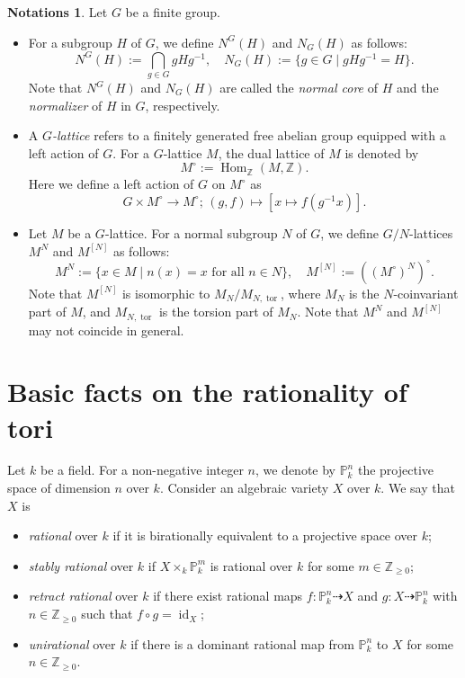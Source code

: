 \documentclass[12pt]{amsart}
\theoremstyle{plain}
\theoremstyle{definition}
\newtheorem*{nota}{Notations}
\numberwithin{thm}{section}
\numberwithin{equation}{section}
\newcommand{\Znn}{\mathbb{Z}_{\geq 0}}
\newcommand{\Z}{\mathbb{Z}}
\renewcommand{\P}{\mathbb{P}}
\DeclareMathOperator{\Hom}{Hom}
\DeclareMathOperator{\id}{id}
\DeclareMathOperator{\tor}{tor}
\begin{document}
\begin{nota}
Let $G$ be a finite group. 
\begin{itemize}
\item For a subgroup $H$ of $G$, we define $N^{G}(H)$ and $N_{G}(H)$ as follows: 
\begin{equation*}
N^{G}(H):=\bigcap_{g\in G}gHg^{-1},\quad
N_{G}(H):=\{g\in G\mid gHg^{-1}=H\}. 
\end{equation*}
Note that $N^{G}(H)$ and $N_{G}(H)$ are called the \emph{normal core} of $H$ and the \emph{normalizer} of $H$ in $G$, respectively. 
\item A \emph{$G$-lattice} refers to a finitely generated free abelian group equipped with a left action of $G$. For a $G$-lattice $M$, the dual lattice of $M$ is denoted by
\begin{equation*}
    M^{\circ}:=\Hom_{\Z}(M,\Z). 
\end{equation*}
Here we define a left action of $G$ on $M^{\circ}$ as
\begin{equation*}
    G\times M^{\circ} \rightarrow M^{\circ};\,(g,f)\mapsto [x\mapsto f(g^{-1}x)]. 
\end{equation*}
\item Let $M$ be a $G$-lattice. For a normal subgroup $N$ of $G$, we define $G/N$-lattices $M^{N}$ and $M^{[N]}$ as follows: 
\begin{equation*}
M^{N}:=\{x\in M\mid n(x)=x\text{ for all }n\in N\},\quad 
M^{[N]}:=\left((M^{\circ})^{N}\right)^{\circ}. 
\end{equation*}
Note that $M^{[N]}$ is isomorphic to $M_{N}/M_{N,\tor}$, where $M_{N}$ is the $N$-coinvariant part of $M$, and $M_{N,\tor}$ is the torsion part of $M_{N}$. Note that $M^{N}$ and $M^{[N]}$ may not coincide in general. 
\end{itemize}
\end{nota}

\section{Basic facts on the rationality of tori}\label{sect:rttr}

Let $k$ be a field. For a non-negative integer $n$, we denote by $\P_{k}^{n}$ the projective space of dimension $n$ over $k$. Consider an algebraic variety $X$ over $k$. We say that $X$ is
\begin{itemize}
    \item \emph{rational} over $k$ if it is birationally equivalent to a projective space over $k$; 
    \item \emph{stably rational} over $k$ if $X\times_{k}\P_{k}^{m}$ is rational over $k$ for some $m\in \Znn$; 
    \item \emph{retract rational} over $k$ if there exist rational maps $f\colon \P_{k}^{n}\dashrightarrow X$ and $g\colon X\dashrightarrow \P_{k}^{n}$ with $n\in \Znn$ such that $f\circ g=\id_{X}$; 
    \item \emph{unirational} over $k$ if there is a dominant rational map from $\P_{k}^{n}$ to $X$ for some $n\in \Znn$. 
\end{itemize}
\end{document}
